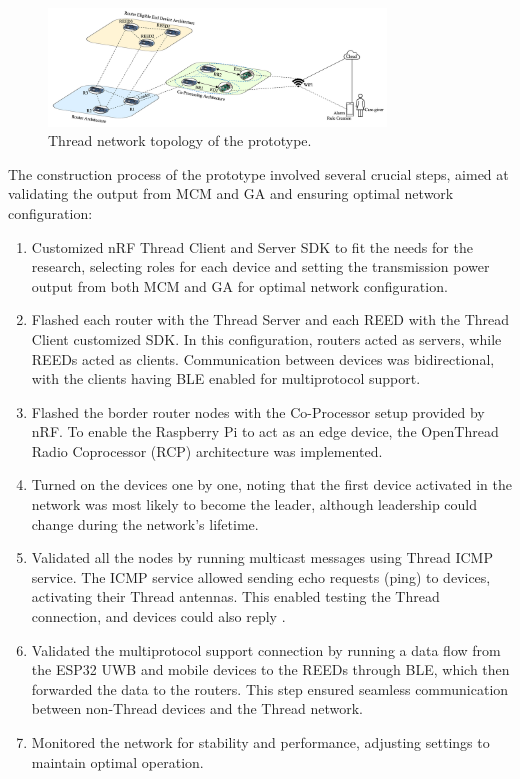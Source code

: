 \begin{figure}[H]
    \centering
    \includegraphics[width=0.8\textwidth]{images/research_design/prototype.png}
    \caption{Thread network topology of the prototype.}
    \label{fig:prototype}
\end{figure}

The construction process of the prototype involved several crucial steps, aimed at validating the output from MCM and GA and ensuring optimal network configuration:

\begin{enumerate}
    \item Customized nRF Thread Client and Server SDK to fit the needs for the research, selecting roles for each device and setting the transmission power output from both MCM and GA for optimal network configuration.
    \item Flashed each router with the Thread Server and each REED with the Thread Client customized SDK. In this configuration, routers acted as servers, while REEDs acted as clients. Communication between devices was bidirectional, with the clients having BLE enabled for multiprotocol support.
    \item Flashed the border router nodes with the Co-Processor setup provided by nRF. To enable the Raspberry Pi to act as an edge device, the OpenThread Radio Coprocessor (RCP) architecture was implemented.
    \item Turned on the devices one by one, noting that the first device activated in the network was most likely to become the leader, although leadership could change during the network's lifetime.
    \item Validated all the nodes by running multicast messages using Thread ICMP service. The ICMP service allowed sending echo requests (ping) to devices, activating their Thread antennas. This enabled testing the Thread connection, and devices could also reply \cite{Thread_Group_Fundamentals}.
    \item Validated the multiprotocol support connection by running a data flow from the ESP32 UWB and mobile devices to the REEDs through BLE, which then forwarded the data to the routers. This step ensured seamless communication between non-Thread devices and the Thread network.
    \item Monitored the network for stability and performance, adjusting settings to maintain optimal operation.
\end{enumerate}

